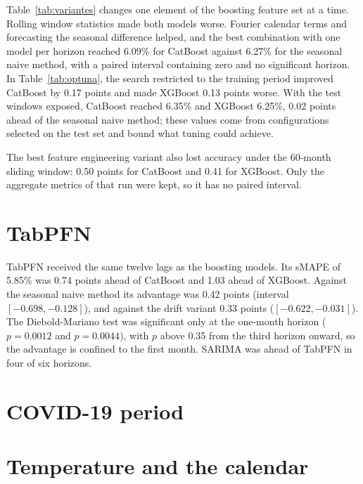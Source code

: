 



Table~\ref{tab:variantes} changes one element of the boosting feature set at a time. Rolling
window statistics made both models worse. Fourier calendar terms and forecasting the
seasonal difference helped, and the best combination with one model per horizon reached
6.09\% for CatBoost against 6.27\% for the seasonal naive method, with a paired interval
containing zero and no significant horizon. In Table~\ref{tab:optuna}, the search restricted
to the training period improved CatBoost by 0.17 points and made XGBoost 0.13 points worse.
With the test windows exposed, CatBoost reached 6.35\% and XGBoost 6.25\%, 0.02 points ahead
of the seasonal naive method; these values come from configurations selected on the test set
and bound what tuning could achieve.

The best feature engineering variant also lost accuracy under the 60-month sliding window:
0.50 points for CatBoost and 0.41 for XGBoost. Only the aggregate metrics of that run were
kept, so it has no paired interval.

\section{TabPFN}

TabPFN received the same twelve lags as the boosting models. Its sMAPE of 5.85\% was 0.74
points ahead of CatBoost and 1.03 ahead of XGBoost. Against the seasonal naive method its
advantage was 0.42 points (interval $[-0.698, -0.128]$), and against the drift variant 0.33
points ($[-0.622, -0.031]$). The Diebold-Mariano test was significant only at the one-month
horizon ($p=0.0012$ and $p=0.0044$), with $p$ above 0.35 from the third horizon onward, so
the advantage is confined to the first month. SARIMA was ahead of TabPFN in four of six
horizons.

\section{COVID-19 period}



\section{Temperature and the calendar}




